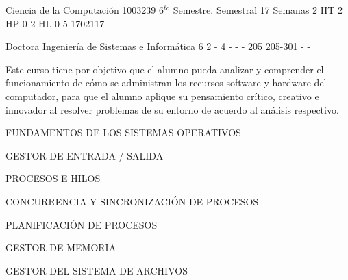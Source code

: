 \documentclass[a4paper,8pt]{article}
\begin{document}
\sylabusHeader

\academicaTable
{Ciencia de la Computación} %
{1003239} %
{6$^{to}$ Semestre.} %
{Semestral} %
{17 Semanas} %
{2 HT} %
{2 HP} %
{0} %
{2 HL}  %
{0} %
{5} %
{1702117} %

\administrativaTable
{Doctora} %
{Ingeniería de Sistemas e Informática} %
{6} %
{2} %
{-} %
{4} %
{-} %
{-} %
{-} %
{205} %
{205-301} %
{-} %
{-} %


\begin{fundamentacion}
Este curso tiene por objetivo que el alumno pueda analizar y comprender el funcionamiento de cómo se administran los recursos software y hardware del computador, para que el alumno aplique su pensamiento crítico, creativo e innovador al resolver problemas de su entorno de acuerdo al análisis  respectivo.

\end{fundamentacion}

\begin{sumilla}
\item FUNDAMENTOS DE LOS SISTEMAS OPERATIVOS 
\item GESTOR DE ENTRADA / SALIDA 
\item PROCESOS E HILOS 
\item CONCURRENCIA Y SINCRONIZACIÓN DE PROCESOS 
\item PLANIFICACIÓN DE PROCESOS 
\item GESTOR DE MEMORIA 
\item GESTOR DEL SISTEMA DE ARCHIVOS 


\end{sumilla}

\begin{competenciasAsignatura}
\item {}
\item {}
\item {}

\end{competenciasAsignatura}
\end{document}
